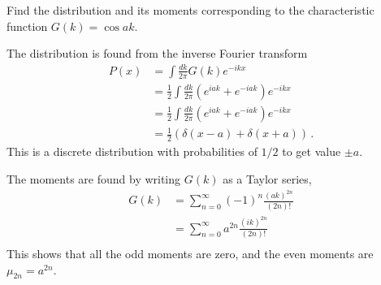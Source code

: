 

Find the distribution and its moments corresponding to the characteristic function $G(k) = \cos ak$.


The distribution is found from the inverse Fourier transform
\begin{align*}
P(x)
&= \int \frac{dk}{2\pi} G(k) e^{-i k x} \\
&= \frac{1}{2} \int \frac{dk}{2\pi} \left( e^{i a k} + e^{-i a k} \right) e^{-i k x} \\
&= \frac{1}{2} \int \frac{dk}{2\pi} \left( e^{i a k} + e^{-i a k} \right) e^{-i k x} \\
&= \frac{1}{2} \left( \delta (x - a) + \delta(x + a) \right) \, .
\end{align*}
This is a discrete distribution with probabilities of $1/2$ to get value $\pm a$.

The moments are found by writing $G(k)$ as a Taylor series,
\begin{align*}
G(k)
&= \sum_{n=0}^\infty (-1)^n \frac{(ak)^{2n}}{(2n)!} \\
&= \sum_{n=0}^\infty a^{2n} \frac{(ik)^{2n}}{(2n)!} \\
\end{align*}
This shows that all the odd moments are zero, and the even moments are $\mu_{2n} = a^{2n}$.
